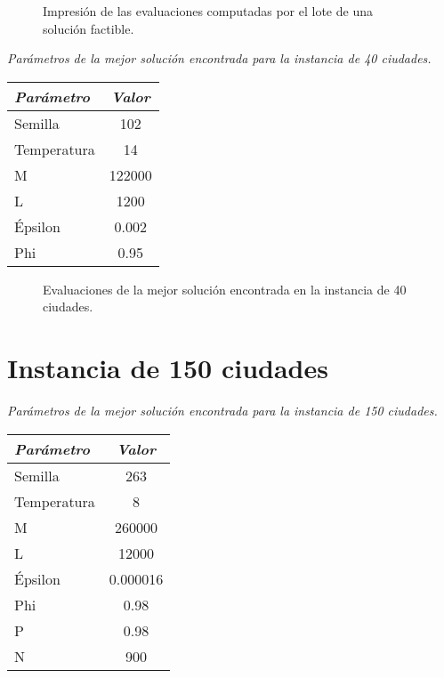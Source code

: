 \documentclass[a4paper]{report}
\begin{document}
\begin{figure}[h!tbp]
  \hspace*{-1.6cm}
  
  \caption{Impresi\'on de las evaluaciones computadas por el lote de una soluci\'on factible.}
\end{figure}
\clearpage
\begin{center}
  \textit{Par\'ametros de la mejor soluci\'on encontrada para la instancia de 40 ciudades.}
\end{center}
\begin{table}[h!]
  \begin{center}
    \begin{tabular}{||l|c||}
      \hline
      \textit{Par\'ametro} & \textit{Valor}\\
      \hline
      Semilla & 102 \\
      Temperatura & 14 \\
      M & 122000 \\
      L & 1200 \\
      \'Epsilon & 0.002 \\
      Phi & 0.95 \\
      \hline
    \end{tabular}
  \end{center}
\end{table}

\begin{figure}[h!tbp]
  \hspace*{-1.6cm}
  
  \caption{Evaluaciones de la mejor soluci\'on encontrada en la instancia de 40 ciudades.}
\end{figure}
\clearpage

\section{Instancia de 150 ciudades}

\begin{center}
  \textit{Par\'ametros de la mejor soluci\'on encontrada para la instancia de 150 ciudades.}
\end{center}
\begin{table}[h!]
  \begin{center}
    \begin{tabular}{||l|c||}
      \hline
      \textit{Par\'ametro} & \textit{Valor}\\
      \hline
      Semilla & 263 \\
      Temperatura & 8 \\
      M & 260000 \\
      L & 12000 \\
      \'Epsilon & 0.000016 \\
      Phi & 0.98 \\
      P & 0.98 \\
      N & 900 \\
      \hline
    \end{tabular}
  \end{center}
\end{table}
\end{document}
